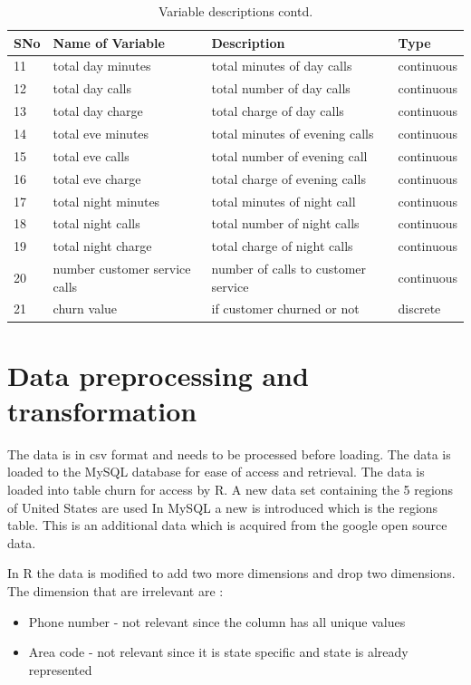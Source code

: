 \begin{table}[h]
	\centering
	\caption{Variable descriptions contd.}
	\label{var-2}
	\begin{tabular}{llll}
		\hline
		SNo & Name of Variable & Description            & Type                \\
		\hline
		11 & total day minutes &  total minutes of day calls  &  continuous   \\
		12 & total day calls & total number of day calls &  continuous   \\
		13 & total day charge & total charge of day calls &  continuous   \\
		14 & total eve minutes & total minutes of evening calls &  continuous   \\
		15 & total eve calls & total number of evening call  &  continuous   \\
		16 & total eve charge & total charge of evening calls  &  continuous   \\
		17 & total night minutes & total minutes of night call &  continuous   \\
		18 & total night calls & total number of night calls &  continuous   \\
		19 & total night charge & total charge of night calls  &  continuous   \\
		20 & number customer service calls & number of calls to customer service &  continuous   \\
		21 & churn value & if customer churned or not & discrete \\
		\hline
	\end{tabular}
\end{table}

\section{Data preprocessing and transformation}

The data is in csv format and needs to be processed before loading. The data is loaded to the MySQL database for ease of access and retrieval. The data is loaded into table churn for access by R.
A new data set containing the 5 regions of United States are used   In MySQL a new is introduced which is the regions table. This is an additional data which is acquired from the google open source data. 

In R the data is modified to add two more dimensions and drop two dimensions. 
The dimension that are irrelevant are :
\begin{itemize}
	\item Phone number - not relevant since the column has all unique values
	\item Area code - not relevant since it is state specific and state is already represented
\end{itemize}

